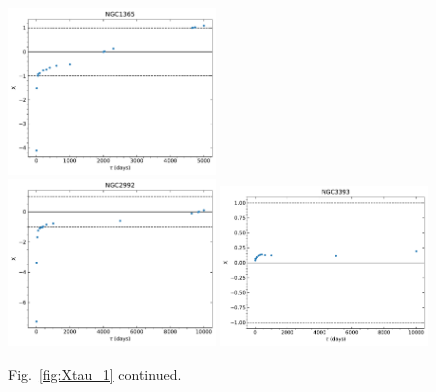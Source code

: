 \begin{figure}
\begin{center}
{  \includegraphics[width=0.49\textwidth]{Figs/Chapter5/X_tau/X_tau_NGC1365.pdf} \\
  \includegraphics[width=0.49\textwidth]{Figs/Chapter5/X_tau/X_tau_NGC2992.pdf}  \hfill
  \includegraphics[width=0.49\textwidth]{Figs/Chapter5/X_tau/X_tau_NGC3393.pdf}  \hfill
  \caption{Fig.~\ref{fig:Xtau_1} continued.}
    \label{fig:Xtau_4}
  }
\end{center}
\end{figure}

